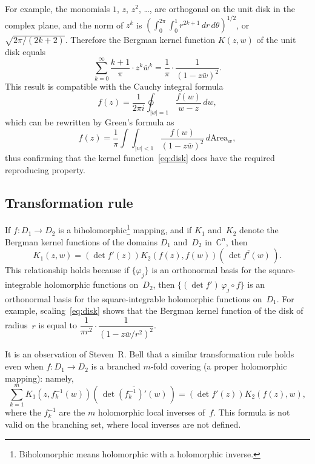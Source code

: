 \documentclass[12pt]{amsart}
\theoremstyle{definition}
\newcommand{\C}{\mathbb{C}}
\renewcommand{\iint}{\int\!\!\!\int}
\begin{document}
For example, the monomials \(1\), \(z\), \(z^2\), 
\ldots, are orthogonal on the unit disk in the complex plane, and
the norm of \(z^k\) is \((\int_{0}^{2\pi} \int_{0}^{1}
r^{2k+1}\,dr\,d\theta)^{1/2}\), or \(\sqrt{2\pi/(2k+2)}\).
Therefore the Bergman kernel function \(K(z,w)\) of the unit disk
equals
\begin{equation}
  \label{eq:disk}
  \sum_{k=0}^\infty \frac{k+1}{\pi} \cdot z^k \bar w^k 
  = \frac{1}{\pi}\cdot \frac{1}{(1-z\bar w)^2}.
\end{equation}
This result is compatible with the Cauchy integral formula
\begin{equation*}
f(z)=\frac{1}{2\pi i}\oint_{|w|=1}
\frac{f(w)}{w-z}\,dw,
\end{equation*}
which can be rewritten by Green's formula as
\begin{equation*}
f(z)=\frac{1}{\pi}\iint_{|w|<1} \frac{f(w)}{(1-z\bar w)^2}
\,d\text{Area}_w,
\end{equation*}
thus confirming that the kernel function~\eqref{eq:disk} does
have the required reproducing property.
 
\subsection{Transformation rule}
If \(f:D_1\to D_2\) is a biholomorphic\footnote{Biholomorphic
  means holomorphic with a holomorphic inverse.} mapping, and if
\(K_1\) and~\(K_2\) denote the Bergman kernel functions of the
domains \(D_1\) and~\(D_2\) in~\(\C^n\), then
\begin{equation}
\label{eq:transform}
K_1(z,w)=(\det f'(z)) K_2(f(z), f(w)) (\,\overline{\det f'(w)}\,).
\end{equation}
This relationship holds because if \(\{\varphi_j\}\) is an
orthonormal basis for the square-integrable holomorphic functions
on~\(D_2\), then \(\{(\det f') \,\varphi_j\circ f\}\) is an
orthonormal basis for the square-integrable holomorphic functions
on~\(D_1\). For example, scaling~\eqref{eq:disk} shows that the
Bergman kernel function of the disk of radius~\(r\) is equal to
\(\dfrac{1}{\pi r^2}\cdot \dfrac{1}{(1-z\bar w/r^2)^2}\).

It is an observation of Steven~R. Bell \cite{bell1981, bell1982}
that a similar transformation rule holds even when \(f:D_1\to
D_2\) is a branched \(m\)-fold covering (a proper holomorphic
mapping): namely,
\begin{equation*}
\sum_{k=1}^m K_1(z, f_k^{-1}(w)) 
(\,\overline{\det (f_k^{-1})'(w)}\,) =
(\det f'(z)) K_2(f(z),w),
\end{equation*}
where the \(f_k^{-1}\) are the \(m\) holomorphic local inverses
of~\(f\).  This formula is not valid on the branching set, where
local inverses are not defined.
\end{document}
